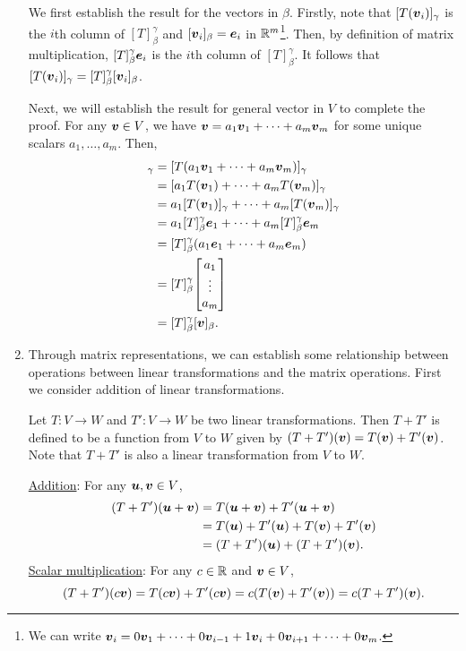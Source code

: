 \begin{enumerate}
\begin{pf}
We first establish the result for the vectors in \(\beta\). Firstly, note that
\([T(\vb*{v}_i)]_{\gamma}\) is the \(i\)th column of \([T]_{\beta}^{\gamma}\)
and \([\vb*{v}_i]_{\beta}=\vb*{e}_i\) in \(\mathbb{R}^m\)\footnote{We can write
\(\vb*{v}_i=0\vb*{v}_1+\dotsb+0\vb*{v}_{i-1}+1\vb*{v}_i+0\vb*{v}_{i+1}
+\dotsb+0\vb*{v}_m\).}. Then, by definition of matrix multiplication,
\([T]_{\beta}^{\gamma}\vb*{e}_i\) is the \(i\)th column of
\([T]_{\beta}^{\gamma}\). It follows that
\([T(\vb*{v}_i)]_{\gamma}=[T]_{\beta}^{\gamma}[\vb*{v}_i]_{\beta}\).

Next, we will establish the result for general vector in \(V\) to complete the
proof. For any \(\vb*{v}\in V\), we have
\(\vb*{v}=a_1\vb*{v}_1+\dotsb+a_m\vb*{v}_m\) for some unique scalars
\(a_1,\dotsc,a_m\). Then,
\begin{align*}
[T(\vect{v})]_{\gamma}&=[T(a_1\vect{v}_1+\dotsb+a_m\vect{v}_m)]_{\gamma} \\
&=[a_1T(\vect{v}_1)+\dotsb+a_mT(\vect{v}_m)]_{\gamma} \\
&=a_1[T(\vect{v}_1)]_{\gamma}+\dotsb+a_m[T(\vect{v}_m)]_{\gamma} \\
&=a_1[T]_{\beta}^{\gamma}\vect{e}_1+\dotsb+a_m[T]_{\beta}^{\gamma}\vect{e}_m \\
&=[T]_{\beta}^{\gamma}(a_1\vect{e}_1+\dotsb+a_m\vect{e}_m) \\
&=[T]_{\beta}^{\gamma}\mqty[a_1\\ \vdots\\ a_m] \\
&=[T]_{\beta}^{\gamma}[\vect{v}]_{\beta}.
\end{align*}
\end{pf}

\item Through matrix representations, we can establish some relationship
between operations between linear transformations and the matrix operations.
First we consider addition of linear transformations.

Let \(T:V\to W\) and \(T':V\to W\) be two linear transformations. Then \(T+T'\)
is defined to be a function from \(V\) to \(W\) given by
\((T+T')(\vb*{v})=T(\vb*{v})+T'(\vb*{v})\). Note that
\(T+T'\) is also a linear transformation from \(V\) to \(W\).

\begin{pf}
\underline{Addition}: For any \(\vb*{u},\vb*{v}\in V\),
\begin{align*}
(T+T')(\vb*{u}+\vb*{v})&=T(\vb*{u}+\vb*{v})+T'(\vb*{u}+\vb*{v}) \\
&=T(\vb*{u})+T'(\vb*{u})+T(\vb*{v})+T'(\vb*{v}) \\
&=(T+T')(\vb*{u})+(T+T')(\vb*{v}).
\end{align*}
\underline{Scalar multiplication}: For any \(c\in\mathbb{R}\) and \(\vb*{v}\in V\),
\[
(T+T')(c\vb*{v})=T(c\vb*{v})+T'(c\vb*{v})
=c(T(\vb*{v})+T'(\vb*{v}))
=c(T+T')(\vb*{v}).
\]
\end{pf}


\end{enumerate}
